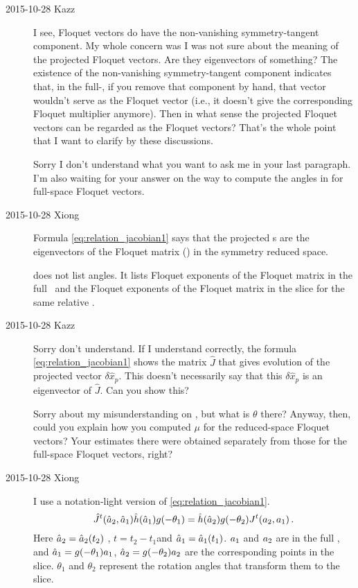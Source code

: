 \begin{description}
\item[2015-10-28 Kazz]
I see, Floquet vectors do have the non-vanishing symmetry-tangent component. My whole concern was I was not sure about the meaning of the projected Floquet vectors. Are they eigenvectors of something? The existence of the non-vanishing symmetry-tangent component indicates that, in the full-\statesp, if you remove that component by hand, that vector wouldn't serve as the Floquet vector (i.e., it doesn't give the corresponding Floquet multiplier anymore). Then in what sense the projected Floquet vectors can be regarded as the Floquet vectors? That's the whole point that I want to clarify by these discussions.

Sorry I don't understand what you want to ask me in your last paragraph. I'm also waiting for your answer on the way to compute the angles in  for full-space Floquet vectors.

\item[2015-10-28 Xiong]
Formula \eqref{eq:relation_jacobian1} says that the projected \Fv s
are the eigenvectors of the Floquet matrix (\jacobianM) in the symmetry reduced space.

 does not list angles. It lists Floquet exponents
of the Floquet matrix in the full \statesp\ and the Floquet exponents
of the Floquet matrix in the slice for the same relative \po.

\item[2015-10-28 Kazz]
Sorry don't understand. If I understand correctly, the formula
\eqref{eq:relation_jacobian1} shows the matrix $\hat{J}$ that gives
evolution of the projected vector $\delta \hat{x}_p$. This doesn't
necessarily say that this $\delta \hat{x}_p$ is an eigenvector of
$\hat{J}$. Can you show this?

Sorry about my misunderstanding on , but what is
$\theta$ there? Anyway, then, could you explain how you computed $\mu$
for the reduced-space Floquet vectors? Your estimates there were obtained
separately from those for the full-space Floquet vectors, right?

\item[2015-10-28 Xiong]
I use a notation-light version of \eqref{eq:relation_jacobian1}.
\begin{equation}
  \hat{J}^t(\hat{a}_2,\hat{a}_1)\hat{h}
  (\hat{a}_1)g(-\theta_{1})=
  \hat{h}(\hat{a}_2)g(-\theta_{2})J^t(a_2,a_1)
\,.
\label{eq:blogex}
\end{equation}
Here $\hat{a}_2 = \hat{a}_2(t_2)$ , $t=t_2-t_1$and
$\hat{a}_1 = \hat{a}_1(t_1)$. $a_1$ and $a_2$ are in the
full \statesp, and $\hat{a}_1 = g(-\theta_1) a_1$,
$\hat{a}_2 = g(-\theta_2) a_2$ are the corresponding points in the
slice. $\theta_1$ and $\theta_2$ represent the rotation angles
that transform
them to the slice.


\end{description}
